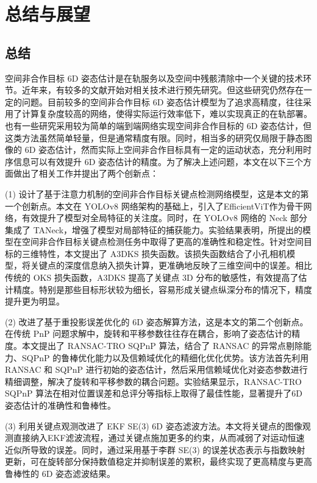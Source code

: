 \chapter{总结与展望}

\section{总结}

空间非合作目标 6D 姿态估计是在轨服务以及空间中残骸清除中一个关键的技术环节。近年来，有较多的文献开始对相关技术进行预先研究。但这些研究仍然存在一定的问题。目前较多的空间非合作目标 6D 姿态估计模型为了追求高精度，往往采用了计算复杂度较高的网络，使得实际运行效率低下，难以实现真正的在轨部署。也有一些研究采用较为简单的端到端网络实现空间非合作目标的 6D 姿态估计，但这类方法虽然简单轻量，但是通常精度有限。同时，相当多的研究仅局限于静态图像的 6D 姿态估计，然而实际上空间非合作目标具有一定的运动状态，充分利用时序信息可以有效提升 6D 姿态估计的精度。为了解决上述问题，本文在以下三个方面做出了相关工作并提出了两个创新点：

(1) 设计了基于注意力机制的空间非合作目标关键点检测网络模型，这是本文的第一个创新点。本文在 YOLOv8 网络架构的基础上，引入了EfficientViT作为骨干网络，有效提升了模型对全局特征的关注度。同时，在 YOLOv8 网络的 Neck 部分集成了 TANeck，增强了模型对局部特征的捕获能力。实验结果表明，所提出的模型在空间非合作目标关键点检测任务中取得了更高的准确性和稳定性。针对空间目标的三维特性，本文提出了 A3DKS 损失函数。该损失函数结合了小孔相机模型，将关键点的深度信息纳入损失计算，更准确地反映了三维空间中的误差。相比传统的 OKS 损失函数，A3DKS 提高了关键点 3D 分布的敏感性，有效提高了估计精度。特别是那些目标形状较为细长，容易形成关键点纵深分布的情况下，精度提升更为明显。

(2) 改进了基于重投影误差优化的 6D 姿态解算方法，这是本文的第二个创新点。在传统 PnP 问题求解中，旋转和平移参数往往存在耦合，影响了姿态估计的精度。本文提出了 RANSAC-TRO SQPnP 算法，结合了 RANSAC 的异常点剔除能力、SQPnP 的鲁棒优化能力以及信赖域优化的精细化优化优势。该方法首先利用 RANSAC 和 SQPnP 进行初始的姿态估计，然后采用信赖域优化对姿态参数进行精细调整，解决了旋转和平移参数的耦合问题。实验结果显示，RANSAC-TRO SQPnP 算法在相对位置误差和总评分等指标上取得了最佳性能，显著提升了6D 姿态估计的准确性和鲁棒性。

(3) 利用关键点观测改进了 EKF SE(3) 6D 姿态滤波方法。本文将关键点的图像观测直接纳入EKF滤波流程，通过关键点施加更多的约束，从而减弱了对运动恒速近似所导致的误差。同时，通过采用基于李群 SE(3) 的误差状态表示与指数映射更新，可在旋转部分保持数值稳定并抑制误差的累积，最终实现了更高精度与更高鲁棒性的 6D 姿态滤波结果。

